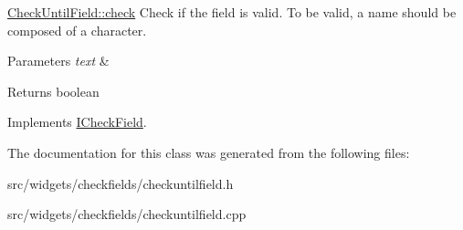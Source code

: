 \hyperlink{classCheckUntilField_acfb9e2f95bebcb5b5d2337e3ac4f4d47}{Check\+Until\+Field\+::check} Check if the field is valid. To be valid, a name should be composed of a character. 


\begin{DoxyParams}{Parameters}
{\em text} & \\
\hline
\end{DoxyParams}
\begin{DoxyReturn}{Returns}
boolean 
\end{DoxyReturn}


Implements \hyperlink{classICheckField_a6bd42b4d49c165cdd92822135123fd4b}{I\+Check\+Field}.



The documentation for this class was generated from the following files\+:\begin{DoxyCompactItemize}
\item 
src/widgets/checkfields/checkuntilfield.\+h\item 
src/widgets/checkfields/checkuntilfield.\+cpp\end{DoxyCompactItemize}
